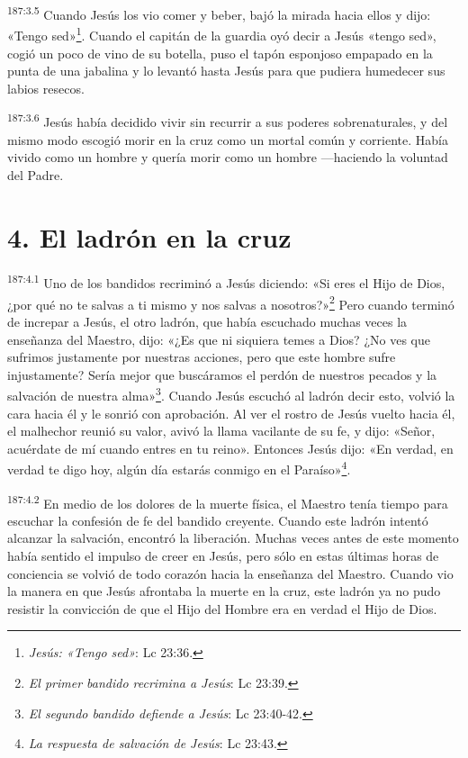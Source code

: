 \par
\textsuperscript{187:3.5} Cuando Jesús los vio comer y beber, bajó la mirada hacia ellos y dijo: «Tengo sed»\footnote{\textit{Jesús: «Tengo sed»}: Lc 23:36.}. Cuando el capitán de la guardia oyó decir a Jesús «tengo sed», cogió un poco de vino de su botella, puso el tapón esponjoso empapado en la punta de una jabalina y lo levantó hasta Jesús para que pudiera humedecer sus labios resecos.

\par
\textsuperscript{187:3.6} Jesús había decidido vivir sin recurrir a sus poderes sobrenaturales, y del mismo modo escogió morir en la cruz como un mortal común y corriente. Había vivido como un hombre y quería morir como un hombre ---haciendo la voluntad del Padre.

\section*{4. El ladrón en la cruz}
\par
\textsuperscript{187:4.1} Uno de los bandidos recriminó a Jesús diciendo: «Si eres el Hijo de Dios, ¿por qué no te salvas a ti mismo y nos salvas a nosotros?»\footnote{\textit{El primer bandido recrimina a Jesús}: Lc 23:39.} Pero cuando terminó de increpar a Jesús, el otro ladrón, que había escuchado muchas veces la enseñanza del Maestro, dijo: «¿Es que ni siquiera temes a Dios? ¿No ves que sufrimos justamente por nuestras acciones, pero que este hombre sufre injustamente? Sería mejor que buscáramos el perdón de nuestros pecados y la salvación de nuestra alma»\footnote{\textit{El segundo bandido defiende a Jesús}: Lc 23:40-42.}. Cuando Jesús escuchó al ladrón decir esto, volvió la cara hacia él y le sonrió con aprobación. Al ver el rostro de Jesús vuelto hacia él, el malhechor reunió su valor, avivó la llama vacilante de su fe, y dijo: «Señor, acuérdate de mí cuando entres en tu reino». Entonces Jesús dijo: «En verdad, en verdad te digo hoy, algún día estarás conmigo en el Paraíso»\footnote{\textit{La respuesta de salvación de Jesús}: Lc 23:43.}.

\par
\textsuperscript{187:4.2} En medio de los dolores de la muerte física, el Maestro tenía tiempo para escuchar la confesión de fe del bandido creyente. Cuando este ladrón intentó alcanzar la salvación, encontró la liberación. Muchas veces antes de este momento había sentido el impulso de creer en Jesús, pero sólo en estas últimas horas de conciencia se volvió de todo corazón hacia la enseñanza del Maestro. Cuando vio la manera en que Jesús afrontaba la muerte en la cruz, este ladrón ya no pudo resistir la convicción de que el Hijo del Hombre era en verdad el Hijo de Dios.

